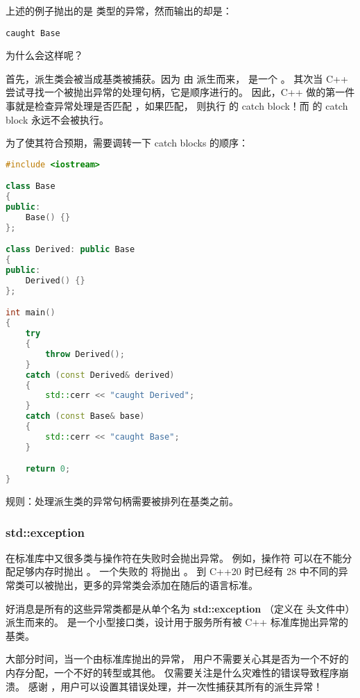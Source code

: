\documentclass[../../LearnCpp.tex]{subfiles}
\begin{document}
上述的例子抛出的是  类型的异常，然而输出的却是：

\begin{lstlisting}
caught Base
\end{lstlisting}

为什么会这样呢？

首先，派生类会被当成基类被捕获。因为  由  派生而来，
 是一个 。
其次当 C++ 尝试寻找一个被抛出异常的处理句柄，它是顺序进行的。
因此，C++ 做的第一件事就是检查异常处理是否匹配 ，如果匹配，
则执行  的 catch block！而  的 catch block 永远不会被执行。

为了使其符合预期，需要调转一下 catch blocks 的顺序：

\begin{lstlisting}[language=C++]
#include <iostream>

class Base
{
public:
    Base() {}
};

class Derived: public Base
{
public:
    Derived() {}
};

int main()
{
    try
    {
        throw Derived();
    }
    catch (const Derived& derived)
    {
        std::cerr << "caught Derived";
    }
    catch (const Base& base)
    {
        std::cerr << "caught Base";
    }

    return 0;
}
\end{lstlisting}

规则：处理派生类的异常句柄需要被排列在基类之前。

\subsubsection*{std::exception}

在标准库中又很多类与操作符在失败时会抛出异常。
例如，操作符  可以在不能分配足够内存时抛出 。
一个失败的  将抛出 。
到 C++20 时已经有 28 中不同的异常类可以被抛出，更多的异常类会添加在随后的语言标准。

好消息是所有的这些异常类都是从单个名为 \textbf{std::exception}
（定义在  头文件中）派生而来的。
是一个小型接口类，设计用于服务所有被 C++ 标准库抛出异常的基类。

大部分时间，当一个由标准库抛出的异常，
用户不需要关心其是否为一个不好的内存分配，一个不好的转型或其他。
仅需要关注是什么灾难性的错误导致程序崩溃。
感谢 ，用户可以设置其错误处理，并一次性捕获其所有的派生异常！
\end{document}
